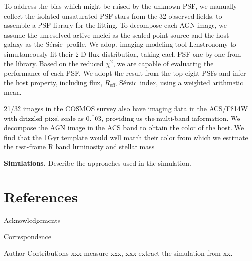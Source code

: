 \documentclass{natureprintstyle}
\newcommand{\hst}{{\it HST}}
\newcommand{\lhost}{$L_{\rm host}$}
\newcommand{\sersic}{S\'ersic}
\newcommand{\lenstronomy}{{\sc Lenstronomy}}
\newcommand{\reff}{{$R_{\mathrm{eff}}$}}
\newcommand{\mstar}{{$M_*$}}
\newcommand{\farcs}{\mbox{\ensuremath{.\!\!^{\prime\prime}}}}%
\begin{document}
To address the bias which might be raised by the unknown PSF, we manually collect the isolated-unsaturated PSF-stars from the 32 observed fields, to assemble a PSF library for the fitting. To decompose each AGN image, we assume the unresolved active nuclei as the scaled point source and the host galaxy as the \sersic\ profile. We adopt imaging modeling tool \lenstronomy\cite{lenstronomy} to simultaneously fit their 2-D flux distribution, taking each PSF one by one from the library. Based on the reduced $\chi^2$, we are capable of evaluating the performance of each PSF. We adopt the result from the top-eight PSFs and infer the host property, including flux, \reff, \sersic\ index, using a weighted arithmetic mean.

21/32 images in the COSMOS survey also have imaging data in the ACS/F814W with drizzled pixel scale as 0\farcs03, providing us the multi-band information. We decompose the AGN image in the ACS band to obtain the color of the host. We find that the 1Gyr template would well match their color from which we estimate the rest-frame R band luminosity and stellar mass. 



\textbf{Simulations.} 
Describe the approaches used in the simulation.


\section*{References}
 


\begin{addendum}
 \item[Acknowledgements] 

%
\item[Correspondence] %
\item[Author Contributions] xxx measure xxx, xxx extract the simulation from xx.
\end{addendum}
\end{document}
